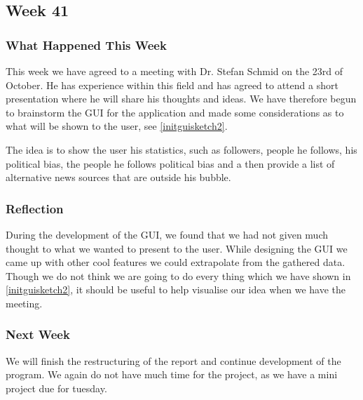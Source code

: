 \subsection{Week 41}\label{week41}
\subsubsection{What Happened This Week}
This week we have agreed to a meeting with Dr. Stefan Schmid on the 23rd of
October. He has experience within this field and has agreed to attend a short
presentation where he will share his thoughts and ideas. We have therefore begun
to brainstorm the \ac{GUI} for the application and made some considerations as
to what will be shown to the user, see \autoref{initguisketch2}.\nl


The idea is to show the user his statistics, such as followers, people he
follows, his political bias, the people he follows political bias and a then
provide a list of alternative news sources that are outside his bubble.

\subsubsection{Reflection} 
During the development of the \ac{GUI}, we found that we had not given much
thought to what we wanted to present to the user. While designing the \ac{GUI}
we came up with other cool features we could extrapolate from the gathered
data. Though we do not think we are going to do every thing which we have shown
in \autoref{initguisketch2}, it should be useful to help visualise our idea when
we have the meeting. 

\subsubsection{Next Week}
We will finish the restructuring of the report and continue development of the
program. We again do not have much time for the project, as we have a mini
project due for tuesday.



% 
% 
% 
